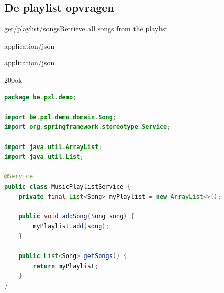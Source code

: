\subsection{De playlist opvragen}


\begin{apiRoute}{get}{/playlist/songs}{Retrieve all songs from the playlist}
\begin{routeParameter}
\end{routeParameter}
\begin{routeRequest}{application/json}
\end{routeRequest}
\begin{routeResponse}{application/json}
\begin{routeResponseItem}{200}{ok}
\begin{routeResponseItemBody}
\end{routeResponseItemBody}
\end{routeResponseItem}
\end{routeResponse}
\end{apiRoute}


\begin{lstlisting}[language=java,  frame=single]
package be.pxl.demo;

import be.pxl.demo.domain.Song;
import org.springframework.stereotype.Service;

import java.util.ArrayList;
import java.util.List;

@Service
public class MusicPlaylistService {
	private final List<Song> myPlaylist = new ArrayList<>();

	public void addSong(Song song) {
		myPlaylist.add(song);
	}

	public List<Song> getSongs() {
		return myPlaylist;
	}
}
\end{lstlisting}


